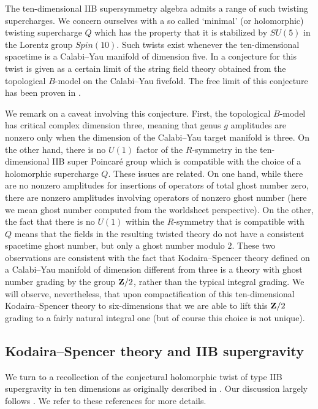 \documentclass[../main.tex]{subfiles}
\begin{document}
The ten-dimensional IIB supersymmetry algebra admits a range of such twisting supercharges.
We concern ourselves with a so called `minimal' (or holomorphic) twisting supercharge $Q$ which has the property that it is stabilized by $SU(5)$ in the Lorentz group $Spin(10)$.
Such twists exist whenever the ten-dimensional spacetime is a Calabi--Yau manifold of dimension five.
In \cite{CLsugra} a conjecture for this twist is given as a certain limit of the string field theory obtained from the topological $B$-model on the Calabi--Yau fivefold.
The free limit of this conjecture has been proven in \cite{SWspinor}.

We remark on a caveat involving this conjecture.
First, the topological $B$-model has critical complex dimension three, meaning that genus $g$ amplitudes are nonzero only when the dimension of the Calabi--Yau target manifold is three.
On the other hand, there is no $U(1)$ factor of the $R$-symmetry in the ten-dimensional IIB super Poincar\'e group which is compatible with the choice of a holomorphic supercharge $Q$.
These issues are related.
On one hand, while there are no nonzero amplitudes for insertions of operators of total ghost number zero, there are nonzero amplitudes involving operators of nonzero ghost number (here we mean ghost number computed from the worldsheet perspective).
On the other, the fact that there is no $U(1)$ within the $R$-symmetry that is compatible with $Q$ means that the fields in the resulting twisted theory do not have a consistent spacetime ghost number, but only a ghost number modulo $2$.
These two observations are consistent with the fact that Kodaira--Spencer theory defined on a Calabi--Yau manifold of dimension different from three is a theory with ghost number grading by the group $\mathbf Z/2$, rather than the typical integral grading.
We will observe, nevertheless, that upon compactification of this ten-dimensional Kodaira--Spencer theory to six-dimensions that we are able to lift this $\mathbf Z/2$ grading to a fairly natural integral one (but of course this choice is not unique).


\subsection{Kodaira--Spencer theory and IIB supergravity}

We turn to a recollection of the conjectural holomorphic twist of type IIB supergravity in ten dimensions as originally described in \cite{CLsugra}. 
Our discussion largely follows \cite{CP}.
We refer to these references for more details.
\end{document}

